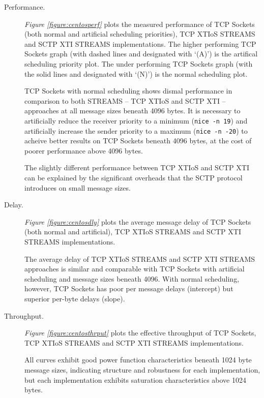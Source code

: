 \documentclass[letterpaper,final,notitlepage,twocolumn,10pt,twoside]{article}
\begin{document}
\begin{description}

\item[Performance.]

\textit{Figure \ref{figure:centosperf}}
plots the measured performance of TCP Sockets (both normal and artificial scheduling priorities),
TCP XTIoS STREAMS and SCTP XTI STREAMS implementations.
The higher performing TCP Sockets graph (with dashed lines and designated with `(A)') is the
artifical scheduling priority plot.  The under performing TCP Sockets graph (with the solid lines
and designated with `(N)') is the normal scheduling plot.

TCP Sockets with normal scheduling shows dismal performance in comparison to both STREAMS -- TCP
XTIoS and SCTP XTI -- approaches at all message sizes beneath 4096 bytes.  It is necessary to
artificially reduce the receiver priority to a minimum (\texttt{nice -n 19}) and artificially
increase the sender priority to a maximum (\texttt{nice -n -20}) to acheive better results on TCP
Sockets beneath 4096 bytes, at the cost of poorer performance above 4096 bytes.

The slightly different performance between TCP XTIoS and SCTP XTI can be explained by the
significant overheads that the SCTP protocol introduces on small message sizes.

\item[Delay.]

\textit{Figure \ref{figure:centosdly}}
plots the average message delay of TCP Sockets (both normal and artificial), TCP XTIoS STREAMS and
SCTP XTI STREAMS implementations.

The average delay of TCP XTIoS STREAMS and SCTP XTI STREAMS approaches is similar and comparable
with TCP Sockets with artificial scheduling and message sizes beneath 4096.  With normal scheduling,
however, TCP Sockets has poor per message delays (intercept) but superior per-byte delays (slope).

\item[Throughput.]

\textit{Figure \ref{figure:centosthrput}}
plots the effective throughput of TCP Sockets, TCP XTIoS STREAMS and SCTP XTI STREAMS
implementations.

All curves exhibit good power function characteristics beneath 1024 byte message sizes, indicating
structure and robustness for each implementation, but each implementation exhibits saturation
characteristics above 1024 bytes.


\end{description}
\end{document}
